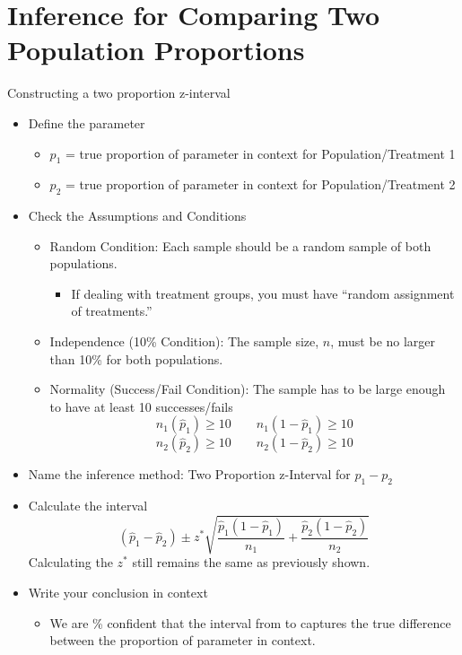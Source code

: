 \documentclass[../stats.tex]{subfiles}
\begin{document}
\section{Inference for Comparing Two Population Proportions}
Constructing a two proportion z-interval 

\begin{itemize}
    \item Define the parameter 
    \begin{itemize}
        \item $p_1$ = true proportion of {parameter in context for Population/Treatment 1}
        \item $p_2$ = true proportion of {parameter in context for Population/Treatment 2}
    \end{itemize}

    \item Check the Assumptions and Conditions 
    \begin{itemize}
        \item Random Condition: Each sample should be a random sample of both populations.
        \begin{itemize}
            \item If dealing with treatment groups, you must have ``random assignment of treatments.''
        \end{itemize}
        \item Independence (10\% Condition): The sample size, $n$, must be no larger than 10\% for both populations.
        \item Normality (Success/Fail Condition): The sample has to be large enough to have at least 10 successes/fails 
        \[ n_1(\hat{p}_1)\geq 10 \qquad n_1(1-\hat{p}_1)\geq 10 \]
        \[ n_2(\hat{p}_2)\geq 10 \qquad n_2(1-\hat{p}_2)\geq 10 \]
    \end{itemize}
    \item Name the inference method: Two Proportion z-Interval for $p_1-p_2$
    \item Calculate the interval 
    \[ (\hat{p}_1-\hat{p}_2)\pm z^*\sqrt{\frac{\hat{p}_1(1-\hat{p}_1)}{n_1}+\frac{\hat{p}_2(1-\hat{p}_2)}{n_2}} \]
    Calculating the $z^*$ still remains the same as previously shown.

    \item Write your conclusion in context
    \begin{itemize}
        \item We are \blank \% confident that the interval from \blank to \blank captures the true difference between the proportion of {parameter in context}.
    \end{itemize}
\end{itemize}
\end{document}
